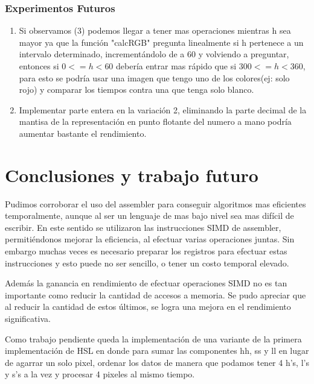 \documentclass[a4paper]{article}
\begin{document}
\subsubsection{Experimentos Futuros}
\begin{enumerate}
  \item
    Si observamos (3) podemos llegar a tener mas operaciones mientras h sea mayor ya que la función "calcRGB" pregunta linealmente si h pertenece a un intervalo determinado, incrementándolo de a 60 y volviendo a preguntar, entonces si $0<=h<60$ debería entrar mas rápido que si $300<=h<360$, para esto se podría usar una imagen que tengo uno de los colores(ej: solo rojo) y comparar los tiempos contra una que tenga solo blanco.

  \item
    Implementar parte entera en la variación 2, eliminando la parte decimal de la mantisa de la representación en punto flotante del numero a mano podría aumentar bastante el rendimiento.
\end{enumerate}

\section{Conclusiones y trabajo futuro}

Pudimos corroborar el uso del assembler para conseguir algoritmos mas eficientes temporalmente, aunque al ser un lenguaje de mas bajo nivel sea mas difícil de escribir. En este sentido se utilizaron las instrucciones SIMD de assembler, permitiéndonos mejorar la eficiencia, al efectuar varias operaciones juntas. Sin embargo muchas veces es necesario preparar los registros para efectuar estas instrucciones y esto puede no ser sencillo, o tener un costo temporal elevado.

Además la ganancia en rendimiento de efectuar operaciones SIMD no es tan importante como reducir la cantidad de accesos a memoria. Se pudo apreciar que al reducir la cantidad de estos últimos, se logra una mejora en el rendimiento significativa.

Como trabajo pendiente queda la implementación de una variante de la primera implementación de HSL en donde para sumar las componentes hh, ss y ll en lugar de agarrar un solo pixel, ordenar los datos de manera que podamos tener 4 h's, l's y s's a la vez y procesar 4 pixeles al mismo tiempo.
\end{document}

